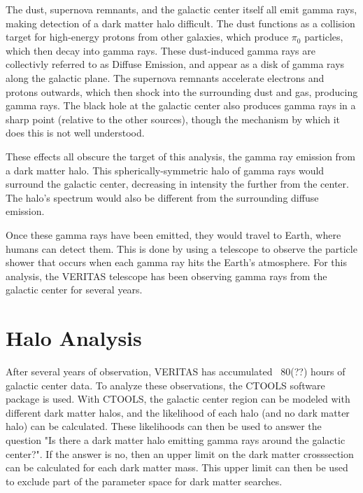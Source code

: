 The dust, supernova remnants, and the galactic center itself all emit gamma rays, making detection of a dark matter halo difficult.
The dust functions as a collision target for high-energy protons from other galaxies, which produce $\pi_0$ particles, which then decay into gamma rays.
These dust-induced gamma rays are collectivly referred to as Diffuse Emission, and appear as a disk of gamma rays along the galactic plane.
The supernova remnants accelerate electrons and protons outwards, which then shock into the surrounding dust and gas, producing gamma rays.
The black hole at the galactic center also produces gamma rays in a sharp point (relative to the other sources), though the mechanism by which it does this is not well understood\cite{gal_cent_still_undetermined}.

These effects all obscure the target of this analysis, the gamma ray emission from a dark matter halo.
This spherically-symmetric halo of gamma rays would surround the galactic center, decreasing in intensity the further from the center.
The halo's spectrum would also be different from the surrounding diffuse emission.

Once these gamma rays have been emitted, they would travel to Earth, where humans can detect them.
This is done by using a telescope to observe the particle shower that occurs when each gamma ray hits the Earth's atmosphere.
For this analysis, the VERITAS telescope has been observing gamma rays from the galactic center for several years.

\section{Halo Analysis}
After several years of observation, VERITAS has accumulated ~80(??) hours of galactic center data.
To analyze these observations, the CTOOLS software package is used.
With CTOOLS, the galactic center region can be modeled with different dark matter halos, and the likelihood of each halo (and no dark matter halo) can be calculated.
These likelihoods can then be used to answer the question "Is there a dark matter halo emitting gamma rays around the galactic center?".
If the answer is no, then an upper limit on the dark matter crosssection can be calculated for each dark matter mass.
This upper limit can then be used to exclude part of the parameter space for dark matter searches.



